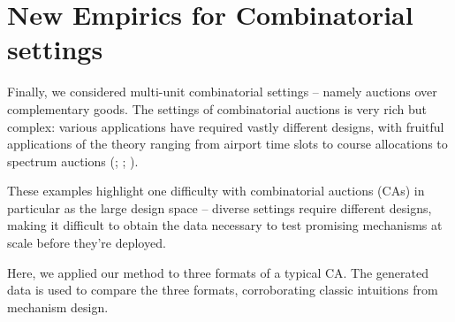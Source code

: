 \documentclass{article} %
\begin{document}


\section{New Empirics for Combinatorial settings}\label{session:combinatorial}
Finally, we considered multi-unit combinatorial settings -- namely auctions over complementary goods. The settings of combinatorial auctions is very rich but complex: various applications have required vastly different designs, with fruitful applications of the theory ranging from airport time slots to course allocations to spectrum auctions (\cite{rassenti1982combinatorial}; \cite{budish2011combinatorial}; \cite{milgrom2020clock}).

These examples highlight one difficulty with combinatorial auctions (CAs) in particular as the large design space -- diverse settings require different designs, making it difficult to obtain the data necessary to test promising mechanisms at scale before they're deployed.

Here, we applied our method to three formats of a typical CA. The generated data is used to compare the three formats, corroborating classic intuitions from mechanism design.
\end{document}
